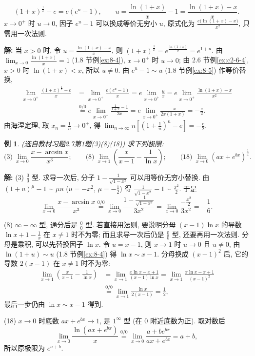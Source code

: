 \documentclass[UTF8,openany]{ctexbook}
\theoremstyle{chinesetextbook}
\newtheorem{example}{例}[section]
\newenvironment{cnsolution}{\par\indent\textbf{解:} \ignorespaces}{\par}
\begin{document}
\[
(1+x)^{\frac1x}-e=e\left(e^u-1\right),\qquad u=\frac{\ln(1+x)}x-1=\frac{\ln(1+x)-x}x.
\]
$x\to0^+$ 时 $u\to0$, 因子 $e^u-1$ 可以换成等价无穷小 $u$, 原式化为 $\displaystyle\frac{e\bigl(\ln(1+x)-x\bigr)}{x^2}$, 只需用一次法则.
\begin{cnsolution}
当 $x>0$ 时, 令 $\displaystyle u=\frac{\ln(1+x)-x}x$, 则 $(1+x)^{\frac1x}=e^{\frac{\ln(1+x)}x}=e^{1+u}$. 由 $\displaystyle\lim_{x\to0}\frac{\ln(1+x)}x=1$ (1.8 节例\ref{ex:8-4}), $x\to0^+$ 时 $u\to0$; 由 2.6 节例\ref{ex:c2-6-4}, $x>0$ 时 $\ln(1+x)<x$, 所以 $u\ne0$. 由 $e^u-1\sim u$ (1.8 节例\ref{ex:8-5}) 作等价替换,
\[
\begin{aligned}
\lim_{x\to0^+}\frac{(1+x)^{\frac1x}-e}x&=\lim_{x\to0^+}\frac{e\left(e^u-1\right)}x=e\lim_{x\to0^+}\frac ux=e\lim_{x\to0^+}\frac{\ln(1+x)-x}{x^2}\\
&\overset{0/0}{=}e\lim_{x\to0^+}\frac{\frac1{1+x}-1}{2x}=e\lim_{x\to0^+}\frac{-x}{2x(1+x)}=-\frac e2.
\end{aligned}
\]
由海涅定理, 取 $\displaystyle x_n=\frac1n\to0^+$, 得 $\displaystyle\lim_{n\to\infty}n\left[\left(1+\frac1n\right)^n-e\right]=-\frac e2$.
\end{cnsolution}
\begin{example}\label{ex:c2-h7-1}
\textnormal{(选自教材习题2.7第1题(3)(8)(18))} 求下列极限:
\[
\text{(3)}\ \lim_{x\to0}\frac{x-\arcsin x}{x^3};\qquad\text{(8)}\ \lim_{x\to1}\left(\frac x{x-1}-\frac1{\ln x}\right);\qquad\text{(18)}\ \lim_{x\to0}\left(ax+e^{bx}\right)^{\frac1x}.
\]
\end{example}
\begin{cnsolution}
(3) $\displaystyle\frac00$ 型. 求导一次后, 分子 $\displaystyle1-\frac1{\sqrt{1-x^2}}$ 可以用等价无穷小替换. 由 $(1+u)^\mu-1\sim\mu u$ ($u=-x^2$, $\displaystyle\mu=-\frac12$) 得 $\displaystyle\frac1{\sqrt{1-x^2}}-1\sim\frac{x^2}2$. 于是
\[
\lim_{x\to0}\frac{x-\arcsin x}{x^3}\overset{0/0}{=}\lim_{x\to0}\frac{1-\frac1{\sqrt{1-x^2}}}{3x^2}=\lim_{x\to0}\frac{-\frac{x^2}2}{3x^2}=-\frac16.
\]

(8) $\infty-\infty$ 型, 通分后是 $\displaystyle\frac00$ 型. 若直接用法则, 要说明分母 $(x-1)\ln x$ 的导数 $\displaystyle\ln x+1-\frac1x$ 在 $x\ne1$ 时不为零; 而且求导一次后仍是 $\displaystyle\frac00$ 型, 还要再用一次法则. 分母是乘积, 可以先替换因子 $\ln x$. 令 $u=x-1$, 则 $x\to1$ 时 $u\to0$ 且 $u\ne0$, 由 $\ln(1+u)\sim u$ (1.8 节例\ref{ex:8-4}) 得 $\ln x\sim x-1$. 分母换成 $(x-1)^2$ 后, 它的导数 $2(x-1)$ 在 $x\ne1$ 时不为零:
\[
\begin{aligned}
\lim_{x\to1}\left(\frac x{x-1}-\frac1{\ln x}\right)&=\lim_{x\to1}\frac{x\ln x-x+1}{(x-1)\ln x}=\lim_{x\to1}\frac{x\ln x-x+1}{(x-1)^2}\\
&\overset{0/0}{=}\lim_{x\to1}\frac{\ln x}{2(x-1)}=\frac12,
\end{aligned}
\]
最后一步仍由 $\ln x\sim x-1$ 得到.

(18) $x\to0$ 时底数 $ax+e^{bx}\to1$, 是 $1^\infty$ 型 (在 $0$ 附近底数为正). 取对数后
\[
\lim_{x\to0}\frac{\ln\left(ax+e^{bx}\right)}x\overset{0/0}{=}\lim_{x\to0}\frac{a+be^{bx}}{ax+e^{bx}}=a+b,
\]
所以原极限为 $e^{a+b}$.
\end{cnsolution}
\end{document}
